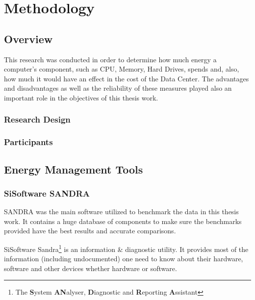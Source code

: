 

\chapter{Methodology} \label{chap3:methodology}

\section{Overview} \label{sec3:overview}
    This research was conducted in order to determine how much energy a computer's component, such as CPU, Memory, Hard Drives, spends and, also, how much it would have an effect in the cost of the Data Center. The advantages and disadvantages as well as the reliability of these measures played also an important role in the objectives of this thesis work.

\subsection{Research Design} \label{sec3:research_design}

\subsection{Participants} \label{sec3:participants}

\section{Energy Management Tools} \label{sec3:energy_management_tools}
\subsection{SiSoftware SANDRA} \label{sec3:sandra}
    SANDRA was the main software utilized to benchmark the data in this thesis work. It contains a huge database of components to make sure the benchmarks provided have the best results and accurate comparisons.
    
    SiSoftware Sandra\footnote{The \textbf{S}ystem \textbf{AN}alyser, \textbf{D}iagnostic and \textbf{R}eporting \textbf{A}ssistant} is an information \& diagnostic utility. It provides most of the information (including undocumented) one need to know about their hardware, software and other devices whether hardware or software.
    
